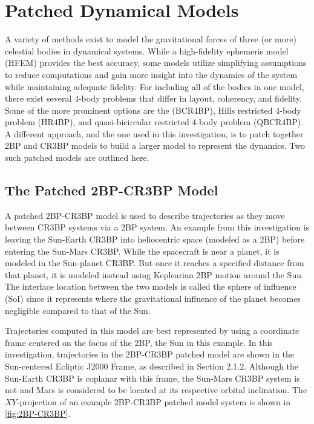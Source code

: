 \section{Patched Dynamical Models}
A variety of methods exist to model the gravitational forces of three (or more) celestial bodies in
dynamical systems. While a high-fidelity ephemeris model (HFEM) provides the best accuracy, some
models utilize simplifying assumptions to reduce computations and gain more insight into the
dynamics of the system while maintaining adequate fidelity. For including all of the bodies in one
model, there exist several 4-body problems that differ in layout, coherency, and fidelity. Some of
the more prominent options are the (BCR4BP)\cite{Boudad:2018}, Hills restricted 4-body problem
(HR4BP)\cite{Scheeres:1998}, and quasi-bicircular restricted 4-body problem
(QBCR4BP)\cite{Andreu:2002}. A different approach, and the one used in this investigation, is to
patch together 2BP and CR3BP models to build a larger model to represent the dynamics. Two such
patched models are outlined here.

\subsection{The Patched 2BP-CR3BP Model}
A patched 2BP-CR3BP model is used to describe trajectories as they move between CR3BP systems via a
2BP system. An example from this investigation is leaving the Sun-Earth CR3BP into heliocentric
space (modeled as a 2BP) before entering the Sun-Mars CR3BP. While the spacecraft is near a planet,
it is modeled in the Sun-planet CR3BP. But once it reaches a specified distance from that planet,
it is modeled instead using Keplearian 2BP motion around the Sun\cite{Canales:2021b}. The interface
location between the two models is called the sphere of influence (SoI) since it represents where
the gravitational influence of the planet becomes negligible compared to that of the Sun.

Trajectories computed in this model are best represented by using a coordinate frame centered on
the focus of the 2BP, the Sun in this example. In this investigation, trajectories in the 2BP-CR3BP
patched model are shown in the Sun-centered Ecliptic J2000 Frame, as described in Section 2.1.2.
Although the Sun-Earth CR3BP is coplanar with this frame, the Sun-Mars CR3BP system is not and Mars
is considered to be located at its respective orbital inclination. The $XY$-projection of an
example 2BP-CR3BP patched model system is shown in \cref{fig:2BP-CR3BP}.

